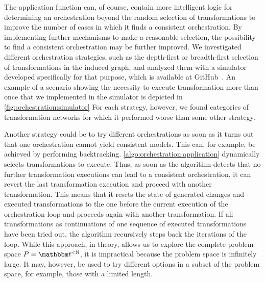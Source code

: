 The application function can, of course, contain more intelligent logic for determining an orchestration beyond the random selection of transformations to improve the number of cases in which it finds a consistent orchestration.
By implementing further mechanisms to make a reasonable selection, the possibility to find a consistent orchestration may be further improved.
We investigated different orchestration strategies, such as the depth-first or breadth-first selection of transformations in the induced graph, and analyzed them with a simulator developed specifically for that purpose, which is available at GitHub~\cite{orchestrationSimulator}.
An example of a scenario showing the necessity to execute transformation more than once that we implemented in the simulator is depicted in \autoref{fig:orchestration:simulator}
For each strategy, however, we found categories of transformation networks for which it performed worse than some other strategy.

Another strategy could be to try different orchestrations as soon as it turns out that one orchestration cannot yield consistent models.
This can, for example, be achieved by performing backtracking.
\autoref{algo:orchestration:application} dynamically selects transformations to execute. 
Thus, as soon as the algorithm detects that no further transformation executions can lead to a consistent orchestration, it can revert the last transformation execution and proceed with another transformation.
This means that it resets the state of generated changes and executed transformations to the one before the current execution of the orchestration loop and proceeds again with another transformation.
If all transformations as continuations of one sequence of executed transformations have been tried out, the algorithm recursively steps back the iterations of the loop.
While this approach, in theory, allows us to explore the complete problem space $P = \transformationset{T}^{< \mathbb{N}}$, it is impractical because the problem space is infinitely large.
It may, however, be used to try different options in a subset of the problem space, for example, those with a limited length.


